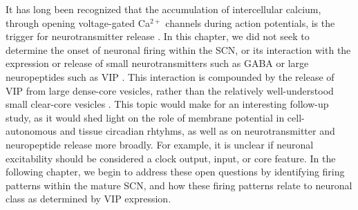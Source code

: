 It has long been recognized that the accumulation of intercellular calcium, through opening voltage-gated Ca$^{2+}$ channels during action potentials, is the trigger for neurotransmitter release \cite{Rubin1970,Shin2003}.
In this chapter, we did not seek to determine the onset of neuronal firing within the SCN, or its interaction with the expression or release of small neurotransmitters such as GABA or large neuropeptides such as VIP \cite{Buijs1995}.
This interaction is compounded by the release of VIP from large dense-core vesicles, rather than the relatively well-understood small clear-core vesicles \cite{Salio2006}.
This topic would make for an interesting follow-up study, as it would shed light on the role of membrane potential in cell-autonomous and tissue circadian rhtyhms, as well as on neurotransmitter and neuropeptide release more broadly.
For example, it is unclear if neuronal excitability should be considered a clock output, input, or core feature.
In the following chapter, we begin to address these open questions by identifying firing patterns within the mature SCN, and how these firing patterns relate to neuronal class as determined by VIP expression.











